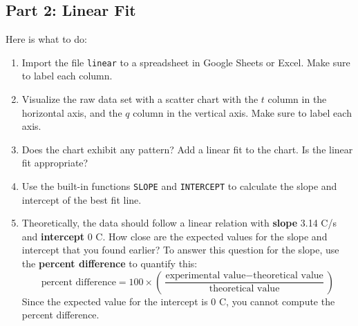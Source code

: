 \subsection{Part 2: Linear Fit}
Here is what to do:
\begin{enumerate}
    \item Import the file \texttt{linear} to a spreadsheet in Google Sheets or Excel. Make sure to label each column.
    \item Visualize the raw data set with a scatter chart with the $t$ column in the horizontal axis, and the $q$ column in the vertical axis. Make sure to label each axis.
    \item Does the chart exhibit any pattern? Add a linear fit to the chart. Is the linear fit appropriate?
    \item Use the built-in functions \texttt{SLOPE} and \texttt{INTERCEPT} to calculate the slope and intercept of the best fit line.
    \item Theoretically, the data should follow a linear relation with \textbf{slope} 3.14 C/s and \textbf{intercept} 0 C. How close are the expected values for the slope and intercept that you found earlier? To answer this question for the slope, use the \textbf{percent difference} to quantify this:
    \begin{equation}
        \text{percent difference} = 100 \times \left(\frac{\text{experimental value} - \text{theoretical value}}{\text{theoretical value}}\right)
    \end{equation}
    Since the expected value for the intercept is 0 C, you cannot compute the percent difference.
\end{enumerate}
